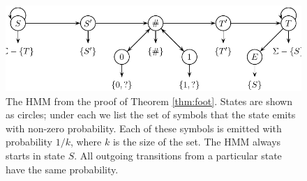 \begin{figure}[t]
\centerline{\includegraphics[scale=0.68]{../figures/jcss/cliquehmm.pdf}}
\caption{\label{fig:footprint_hmm} The HMM from the proof of Theorem
  \ref{thm:foot}. States are shown as circles; under each we
  list the set of symbols that the state emits with non-zero
  probability. Each of these symbols is emitted with probability
  $1/k$, where $k$ is the size of the set. The HMM always starts in
  state $S$. All outgoing transitions from a particular state have
  the same probability.}
\end{figure}
